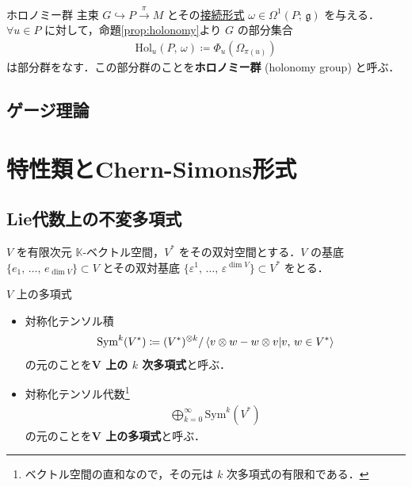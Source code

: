 \documentclass[TQFT_main]{subfiles}
\begin{document}
\begin{mydef}[label=def:holonomy]{ホロノミー群}
    主束 $G \hookrightarrow P \xrightarrow{\pi} M$ とその\hyperref[def:connection]{接続形式} $\omega \in \Omega^1(P;\, \mathfrak{g})$ を与える．
    $\forall u \in P$ に対して，命題\ref{prop:holonomy}より $G$ の部分集合
    \begin{align}
        \mathrm{Hol}_u(P,\, \omega) \coloneqq \Phi_u (\Omega_{\pi(u)})
    \end{align}
    は部分群をなす．この部分群のことを\textbf{ホロノミー群} (holonomy group) と呼ぶ．
\end{mydef}

\subsection{ゲージ理論}


    


\section{特性類とChern-Simons形式}

\subsection{Lie代数上の不変多項式}

$V$ を有限次元 $\mathbb{K}$-ベクトル空間，$V^*$ をその双対空間とする．$V$ の基底 $\{e_1,\, \dots,\, e_{\dim V}\} \subset V$ とその双対基底 $\{\varepsilon^1,\, \dots,\, \varepsilon^{\dim V}\} \subset V^*$ をとる．

\begin{mydef}[label=def:polynomial]{$V$ 上の多項式}
    \begin{itemize}
        \item 対称化テンソル積
        \begin{align}
            \mathrm{Sym}^k (V^*) \coloneqq (V^*)^{\otimes k} / \braket{v \otimes w - w \otimes v}{v,\, w \in V^*}
        \end{align}
        の元のことを\textbf{$\bm{V}$ 上の $k$ 次多項式}と呼ぶ．
        \item 対称化テンソル代数\footnote{ベクトル空間の直和なので，その元は $k$ 次多項式の有限和である．}
        \begin{align}
            \bigoplus_{k=0}^\infty \mathrm{Sym}^k (V^*)
        \end{align}
        の元のことを\textbf{$\bm{V}$ 上の多項式}と呼ぶ．
    \end{itemize}
    
\end{mydef}
\end{document}

